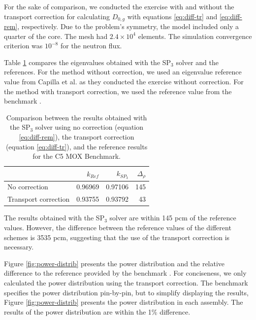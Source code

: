 \documentclass{anstrans}
\begin{document}
For the sake of comparison, we conducted the exercise with and without the transport correction for calculating $D_{0,g}$ with equations \ref{eq:diff-tr} and \ref{eq:diff-rem}, respectively.
Due to the problem's symmetry, the model included only a quarter of the core.
The mesh had $2.4 \times 10^{4}$ elements.
The simulation convergence criterion was $10^{-8}$ for the neutron flux.

Table \ref{tab:keff-2nd} compares the eigenvalues obtained with the SP$_3$ solver and the references.
For the method without correction, we used an eigenvalue reference value from Capilla et al. \cite{capilla_applications_2009} as they conducted the exercise without correction.
For the method with transport correction, we used the reference value from the benchmark \cite{cavarec_benchmark_1994}.
\begin{table}[htbp!]
	\centering
	\caption{Comparison between the results obtained with the SP$_3$ solver using no correction (equation \ref{eq:diff-rem}), the transport correction (equation \ref{eq:diff-tr}), and the reference results for the C5 MOX Benchmark.}
	\label{tab:keff-2nd}
	\begin{tabular}{lrrr}
	\toprule
							& $k_{Ref}$ & $k_{SP_3}$	& $\Delta_{\rho}$	\\
	\midrule
	No correction			& 0.96969	& 0.97106		& 145				\\
	Transport correction	& 0.93755	& 0.93792		& 43				\\
	\bottomrule
	\end{tabular}
\end{table}

The results obtained with the SP$_3$ solver are within 145 pcm of the reference values.
However, the difference between the reference values of the different schemes is 3535 pcm, suggesting that the use of the transport correction is necessary.

Figure \ref{fig:power-distrib} presents the power distribution and the relative difference to the reference provided by the benchmark \cite{cavarec_benchmark_1994}.
For conciseness, we only calculated the power distribution using the transport correction.
The benchmark specifies the power distribution pin-by-pin, but to simplify displaying the results, Figure \ref{fig:power-distrib} presents the power distribution in each assembly.
The results of the power distribution are within the 1\% difference.
\end{document}
